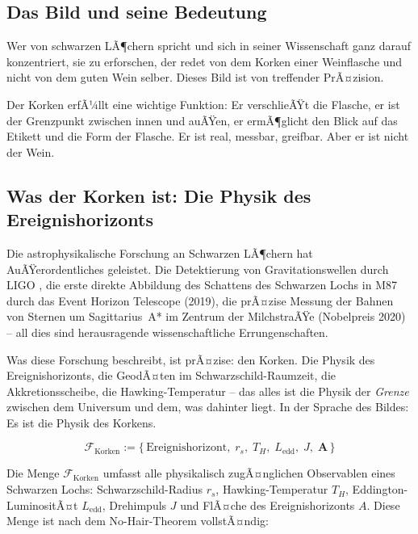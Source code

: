 ﻿\documentclass[12pt,a4paper]{report}
\begin{document}
\subsection{Das Bild und seine Bedeutung}

Wer von schwarzen LÃ¶chern spricht und sich in seiner Wissenschaft ganz darauf konzentriert, sie zu erforschen, der redet von dem Korken einer Weinflasche und nicht von dem guten Wein selber. Dieses Bild ist von treffender PrÃ¤zision.

Der Korken erfÃ¼llt eine wichtige Funktion: Er verschlieÃŸt die Flasche, er ist der Grenzpunkt zwischen innen und auÃŸen, er ermÃ¶glicht den Blick auf das Etikett und die Form der Flasche. Er ist real, messbar, greifbar. Aber er ist nicht der Wein.

\subsection{Was der Korken ist: Die Physik des Ereignishorizonts}

Die astrophysikalische Forschung an Schwarzen LÃ¶chern hat AuÃŸerordentliches geleistet. Die Detektierung von Gravitationswellen durch LIGO \cite{abbott2016ligo}, die erste direkte Abbildung des Schattens des Schwarzen Lochs in M87 durch das Event Horizon Telescope (2019), die prÃ¤zise Messung der Bahnen von Sternen um Sagittarius~A* im Zentrum der MilchstraÃŸe (Nobelpreis 2020) -- all dies sind herausragende wissenschaftliche Errungenschaften.

Was diese Forschung beschreibt, ist prÃ¤zise: den Korken. Die Physik des Ereignishorizonts, die GeodÃ¤ten im Schwarzschild-Raumzeit, die Akkretionsscheibe, die Hawking-Temperatur -- das alles ist die Physik der \emph{Grenze} zwischen dem Universum und dem, was dahinter liegt. In der Sprache des Bildes: Es ist die Physik des Korkens.

\begin{equation}
	\mathcal{F}_{\text{Korken}} := \bigl\{\,\text{Ereignishorizont},\; r_s,\; T_H,\; L_{\text{edd}},\; J,\; \mathbf{A}\,\bigr\}
	\label{eq:korken_menge}
\end{equation}

Die Menge $\mathcal{F}_{\text{Korken}}$ umfasst alle physikalisch zugÃ¤nglichen Observablen eines Schwarzen Lochs: Schwarzschild-Radius $r_s$, Hawking-Temperatur $T_H$, Eddington-LuminositÃ¤t $L_{\text{edd}}$, Drehimpuls $J$ und FlÃ¤che des Ereignishorizonts $A$. Diese Menge ist nach dem No-Hair-Theorem vollstÃ¤ndig:
\end{document}
